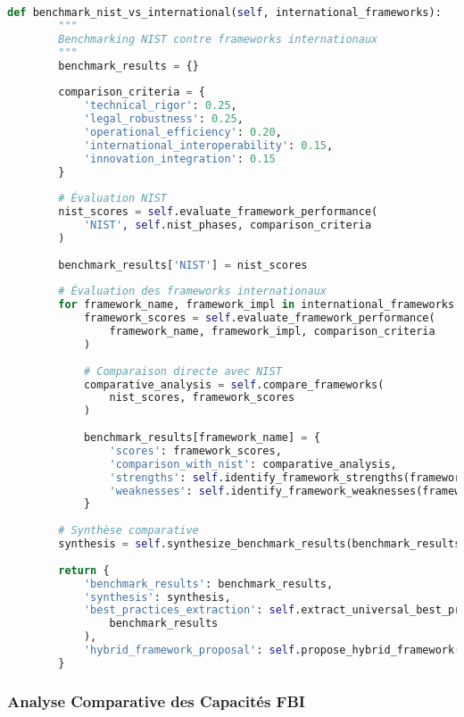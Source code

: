 \begin{lstlisting}[language=Python, caption=Implémentation du framework NIST avec extension CRO]
    def benchmark_nist_vs_international(self, international_frameworks):
        """
        Benchmarking NIST contre frameworks internationaux
        """
        benchmark_results = {}
        
        comparison_criteria = {
            'technical_rigor': 0.25,
            'legal_robustness': 0.25, 
            'operational_efficiency': 0.20,
            'international_interoperability': 0.15,
            'innovation_integration': 0.15
        }
        
        # Évaluation NIST
        nist_scores = self.evaluate_framework_performance(
            'NIST', self.nist_phases, comparison_criteria
        )
        
        benchmark_results['NIST'] = nist_scores
        
        # Évaluation des frameworks internationaux
        for framework_name, framework_impl in international_frameworks.items():
            framework_scores = self.evaluate_framework_performance(
                framework_name, framework_impl, comparison_criteria
            )
            
            # Comparaison directe avec NIST
            comparative_analysis = self.compare_frameworks(
                nist_scores, framework_scores
            )
            
            benchmark_results[framework_name] = {
                'scores': framework_scores,
                'comparison_with_nist': comparative_analysis,
                'strengths': self.identify_framework_strengths(framework_scores),
                'weaknesses': self.identify_framework_weaknesses(framework_scores)
            }
            
        # Synthèse comparative
        synthesis = self.synthesize_benchmark_results(benchmark_results)
        
        return {
            'benchmark_results': benchmark_results,
            'synthesis': synthesis,
            'best_practices_extraction': self.extract_universal_best_practices(
                benchmark_results
            ),
            'hybrid_framework_proposal': self.propose_hybrid_framework(synthesis)
        }
\end{lstlisting}

\subsubsection{Analyse Comparative des Capacités FBI}


